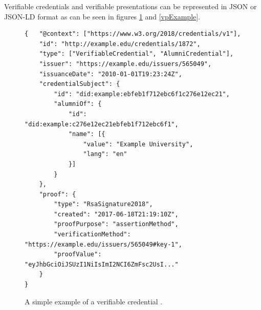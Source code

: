 Verifiable credentials and verifiable presentations can be represented in JSON \cite{json-rfc3986} or JSON-LD \cite{json-ld} format as can be seen in figures \ref{vcExample} and \ref{vpExample}. \\

\begin{figure}[h!]
\begin{lstlisting}[style=json, breaklines=true,frame=single]
{   "@context": ["https://www.w3.org/2018/credentials/v1"],
    "id": "http://example.edu/credentials/1872",
    "type": ["VerifiableCredential", "AlumniCredential"],
    "issuer": "https://example.edu/issuers/565049",
    "issuanceDate": "2010-01-01T19:23:24Z",
    "credentialSubject": {
        "id": "did:example:ebfeb1f712ebc6f1c276e12ec21",
        "alumniOf": {
            "id": "did:example:c276e12ec21ebfeb1f712ebc6f1",
            "name": [{
                "value": "Example University",
                "lang": "en"
            }]
        }
    },    
    "proof": {
        "type": "RsaSignature2018",
        "created": "2017-06-18T21:19:10Z",
        "proofPurpose": "assertionMethod",
        "verificationMethod": "https://example.edu/issuers/565049#key-1",
        "proofValue": "eyJhbGciOiJSUzI1NiIsImI2NCI6ZmFsc2UsI..."
    }
}
\end{lstlisting}
\caption{A simple example of a verifiable credential \cite{vcW3C}. \label{vcExample}}
\end{figure}




